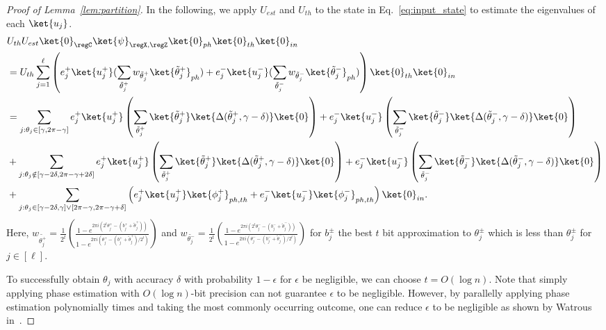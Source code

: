 \begin{proof}[Proof of Lemma~\ref{lem:partition}]
In the following, we apply $U_{est}$ and $U_{th}$ to the state in Eq.~\ref{eq:input_state} to estimate the eigenvalues of each $\ket{u_j}$. 
\begin{align}
    &U_{th}U_{est} \ket{0}_{\regC}\ket{\psi}_{\regX,\regZ}\ket{0}_{ph}\ket{0}_{th}\ket{0}_{in} \\
    &= U_{th}\sum_{j=1}^{\ell} \left(e^+_j \ket{u^+_j}(\sum_{\tilde{\theta}^+_j} w_{\tilde{\theta}^+_j}\ket{\tilde{\theta}^+_j}_{ph}) + e^-_j \ket{u^-_j}(\sum_{\tilde{\theta}^-_j} w_{\tilde{\theta}^-_j}\ket{\tilde{\theta}^-_j}_{ph})\right) \ket{0}_{th}\ket{0}_{in}\\
    &= \sum_{j: \theta_j\in [\gamma,2\pi-\gamma]} e^+_j \ket{u^+_j}\left(\sum_{\tilde{\theta}^+_j}\ket{\tilde{\theta}^+_j} \ket{\Delta(\tilde{\theta}^+_j,\gamma-\delta)}\ket{0}\right) + e^-_j \ket{u^-_j} \left(\sum_{\tilde{\theta}^-_j}\ket{\tilde{\theta}^-_j} \ket{\Delta(\tilde{\theta}^-_j,\gamma-\delta)}\ket{0}\right)
    \label{eq:correct_1}\\
    &+ \sum_{j: \theta_j\notin [\gamma-2\delta,2\pi-\gamma+2\delta]} e^+_j \ket{u^+_j}\left(\sum_{\tilde{\theta}^+_j}\ket{\tilde{\theta}^+_j} \ket{\Delta(\tilde{\theta}^+_j,\gamma-\delta)}\ket{0}\right) + e^-_j \ket{u^-_j} \left(\sum_{\tilde{\theta}^-_j}\ket{\tilde{\theta}^-_j} \ket{\Delta(\tilde{\theta}^-_j,\gamma-\delta)}\ket{0}\right)\label{eq:correct_2}\\
    &+ \sum_{j: \theta_j \in [\gamma-2\delta,\gamma]\vee[2\pi - \gamma,2\pi - \gamma+\delta]} \left(e^+_j\ket{u^+_j}\ket{\phi_j^+}_{ph,th} + e^-_j\ket{u^-_j}\ket{\phi_j^-}_{ph,th}\right) \ket{0}_{in}. 
    \label{eq:grey_part}
\end{align}
Here, $w_{\tilde{\theta_j^+}} = \frac{1}{2^t}\left( \frac{1-e^{2\pi i(2^t\theta_j^{+}-(b_j^+ + \tilde{\theta}_j^+))}}{1-e^{2\pi i(\theta_j^{+}-(b_j^+ + \tilde{\theta}_j^+)/2^t)}}\right)$ and $w_{\tilde{\theta_j^-}} = \frac{1}{2^t}\left( \frac{1-e^{2\pi i(2^t\theta_j^{-}-(b_j^- + \tilde{\theta}_j^-))}}{1-e^{2\pi i(\theta_j^{-}-(b_j^- + \tilde{\theta}_j^-)/2^t)}}\right)$ for $b_j^{\pm}$ the best $t$ bit approximation to $\theta_j^{\pm}$ which is less than $\theta_j^{\pm}$ for $j\in [\ell]$.


To successfully obtain $\theta_j$ with accuracy $\delta$ with probability $1-\epsilon$ for $\epsilon$ be negligible, we can choose $t=O(\log n)$. Note that simply applying phase estimation with $O(\log n)$-bit precision can not guarantee $\epsilon$ to be negligible. However, by parallelly applying phase estimation polynomially times and taking the most commonly occurring outcome, one can reduce $\epsilon$ to be negligible as shown by Watrous in~\cite{Watrous06}.  



\end{proof}
